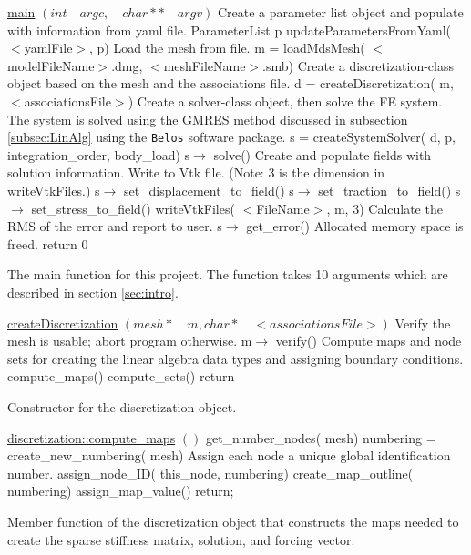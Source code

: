 \documentclass[a4paper, 12pt]{article}
\begin{document}
\vspace{\baselineskip}
\begin{algorithm} [H] 
  \underline{main} $(int \quad argc, \quad char** \quad argv)$ 
  \BlankLine
    \tcc
    {
      Create a parameter list object and populate with information
      from yaml file.  }
    ParameterList p\;
    updateParametersFromYaml( $<$yamlFile$>$, p)\;
    \tcc
    { 
      Load the mesh from file.
    }
    m = loadMdsMesh( $<$modelFileName$>$.dmg, $<$meshFileName$>$.smb)\;
    \tcc
    { 
      Create a discretization-class object based on the mesh
      and the associations file.
    }
    d = createDiscretization( m, $<$associationsFile$>$)\;
    \tcc
    {
      Create a solver-class object, then solve the FE system.
      The system is solved using the GMRES method discussed
      in subsection \ref{subsec:LinAlg} using the
      \texttt{Belos} software package.
    }
    s = createSystemSolver( d, p, integration\_order, body\_load)\;
    s$\rightarrow$ solve()\;
    \tcc
    {
      Create and populate fields with solution information. 
      Write to Vtk file. (Note: 3 is the dimension in writeVtkFiles.)
    }
    s$\rightarrow$ set\_displacement\_to\_field()\;
    s$\rightarrow$ set\_traction\_to\_field()\;
    s$\rightarrow$ set\_stress\_to\_field()\;
    writeVtkFiles( $<$FileName$>$, m, 3)\;
    \tcc
    {
      Calculate the RMS of the error and report to user.
    }
    s$\rightarrow$ get\_error()\;
    \tcc
    {
      Allocated memory space is freed.
    }
    return 0 \;
  \caption{The main function for this project. The function takes 10 
            arguments which are described in section \ref{sec:intro}.}
  \label{al:main}
\end{algorithm}

\vspace{\baselineskip}
\begin{algorithm}[H]
  \underline{createDiscretization} $(mesh* \quad m, char* \quad <associationsFile>)$
  \BlankLine
  \tcc
  {
    Verify the mesh is usable; abort program otherwise.
  }
  m$\rightarrow$ verify()\;
  \tcc
  {
    Compute maps and node sets for creating the linear algebra data types
    and assigning boundary conditions.
  }
  compute\_maps()\;
  compute\_sets()\;
  return\;
  \caption{Constructor for the discretization object.}
  \label{al:creatDisc}
\end{algorithm}

\vspace{\baselineskip}
\begin{algorithm}
  \underline{discretization::compute\_maps} $()$
  \BlankLine
  get\_number\_nodes( mesh)\;
  numbering = create\_new\_numbering( mesh)\;
  {
    \tcc
    {
      Assign each node a unique global identification number.
    }
    assign\_node\_ID( this\_node, numbering)\;
  }
  create\_map\_outline( numbering)\;
  {
    {
      assign\_map\_value()\;
    }
  }
  return;
  \caption{Member function of the discretization object that constructs
            the maps needed to create the sparse stiffness matrix, solution,
            and forcing vector.}
  \label{al:compMaps}
\end{algorithm}
\end{document}
